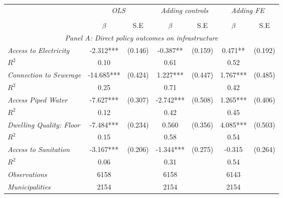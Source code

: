 \begin{tabular}{lcccccc}

\toprule


\multicolumn{1}{l}{} & \multicolumn{2}{c}{\textit{OLS}} & \multicolumn{2}{c}{\textit{Adding controls}} & \multicolumn{2}{c}{\textit{Adding FE}} \\ 
\cmidrule(l{1mm}r{1mm}){2-3} \cmidrule(l{1mm}r{1mm}){4-5} \cmidrule(l{1mm}r{1mm}){6-7}  \\
& $\beta$ & S.E & $\beta$ & S.E & $\beta$ & S.E \\
\hline

\multicolumn{7}{c}{\textit{Panel   A: Direct policy outcomes on infrastructure}}   \\                                                          

\textit{Access to Electricity}          &  -2.312***    & (0.146)      &   -0.387**        &  (0.159)      &     0.471**  &    (0.192)   \\
$R^{2}$			           	   &  0.10   	   & 	   &     0.61   	&		 &     0.52   &  \\

\textit{Connection to Sewerage}          &  -14.685***    & (0.424)      &   1.227***        &  (0.447)      &     1.767***  &    (0.485)   \\
$R^{2}$			           	   &  0.25   & 	   &     0.71   	&		 &     0.42   &  \\
		
\textit{Access Piped Water}          &  -7.627***    & (0.307)      &   -2.742***        &  (0.508)      &     1.265***  &    (0.406)   \\
$R^{2}$			           	   &  0.12   & 	   &     0.42   	&		 &     0.45   &  \\

\textit{Dwelling Quality: Floor}          &  -7.484***    & (0.234)      &   0.560        &  (0.356)      &     4.085***  &    (0.503)   \\
$R^{2}$			           	   &  0.15   & 	   &     0.58   	&		 &     0.54   &  \\

\textit{Access to Sanitation}          &  -3.167***    & (0.206)      &   -1.344***        &  (0.275)      &     -0.315  &    (0.264)   \\
$R^{2}$			           	   &  0.06   & 	   &     0.31   	&		 &     0.54   &  \\


\textit{Observations}                 &   6158    &        & 6158    &  &  6143   &  		\\
\textit{Municipalities}               &   2154   &        & 2154   &  &  2154  &  		\\
\hline		
\hline		


\end{tabular}
